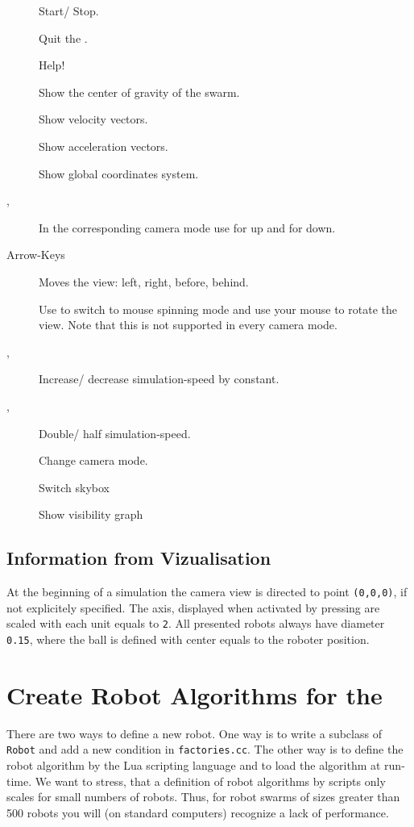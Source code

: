\begin{description}
	\item [] Start/ Stop.
	\item [] Quit the \RSS.
	\item [] Help!
	\item [] Show the center of gravity of the swarm.
	\item [] Show velocity vectors.
	\item [] Show acceleration vectors.
	\item [] Show global coordinates system.
	\item [,] In the corresponding camera mode use  for up  and  for down.
	\item [Arrow-Keys] Moves the view: left, right, before, behind.
	\item [] Use  to switch to mouse spinning mode and use your mouse to rotate the view. Note that this is not supported in every camera mode.
	\item [\fbox{\tt +}, \fbox{\tt -}] Increase/ decrease simulation-speed by constant.
	\item [\fbox{\tt *},\fbox{\tt /}] Double/ half simulation-speed.
	\item [] Change camera mode.
	\item [] Switch skybox
	\item [] Show visibility graph
\end{description}

\subsection{Information from Vizualisation}
At the beginning of a simulation the camera view is directed to point \texttt{(0,0,0)}, if not explicitely specified. The axis, displayed when activated by pressing  are scaled with each unit equals to \texttt{2}. All presented robots always have diameter \texttt{0.15}, where the ball is defined with center equals to the roboter position.

\section{Create Robot Algorithms for the \RSS}
There are two ways to define a new robot. One way is to write a subclass of \texttt{Robot} and add a new condition in \texttt{factories.cc}. The other way is to define the robot algorithm by the {\sffamily Lua} scripting language and to load the algorithm at run-time. We want to stress, that a definition of robot algorithms by \Lua scripts only scales for small numbers of robots. Thus, for robot swarms of sizes greater than 500 robots you will (on standard computers) recognize a lack of performance.

